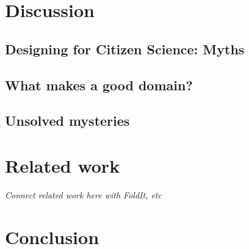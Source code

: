\documentclass{sigchi}
\begin{document}

\section{Discussion}

\subsection{Designing for Citizen Science: Myths}

\subsection{What makes a good domain?}

\subsection{Unsolved mysteries}

\section{Related work}

\emph{Connect related work here with FoldIt, etc}

\section{Conclusion}
\end{document}
